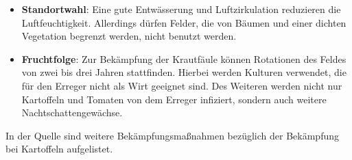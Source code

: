 \begin{itemize}
	\item \textbf{Standortwahl}: Eine gute Entwässerung und Luftzirkulation reduzieren die Luftfeuchtigkeit. Allerdings dürfen Felder, die von Bäumen und einer dichten Vegetation begrenzt werden, nicht benutzt werden. 
	
	\item \textbf{Fruchtfolge}: Zur Bekämpfung der Krautfäule können Rotationen des Feldes von zwei bis drei Jahren stattfinden. Hierbei werden Kulturen verwendet, die für den Erreger nicht als Wirt geeignet sind. Des Weiteren werden nicht nur Kartoffeln und Tomaten von dem Erreger infiziert, sondern auch weitere Nachtschattengewächse.
\end{itemize}

In der Quelle\cite{lbopat} sind weitere Bekämpfungsmaßnahmen bezüglich der Bekämpfung bei Kartoffeln aufgelistet.



